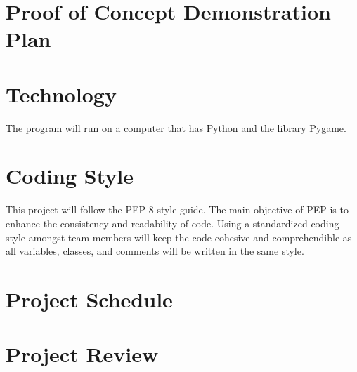 \documentclass{article}
\begin{document}
	
	\section{Proof of Concept Demonstration Plan}
	
	\section{Technology}
	The program will run on a computer that has Python and the library Pygame. 
	
	\section{Coding Style}
	This project will follow the PEP 8 style guide. The main objective of PEP is to enhance the consistency and readability of code. Using a standardized coding style amongst team members will keep the code cohesive and comprehendible as all variables, classes, and comments will be written in the same style. 
	
	\section{Project Schedule}

	
	\section{Project Review}
	
\end{document}
